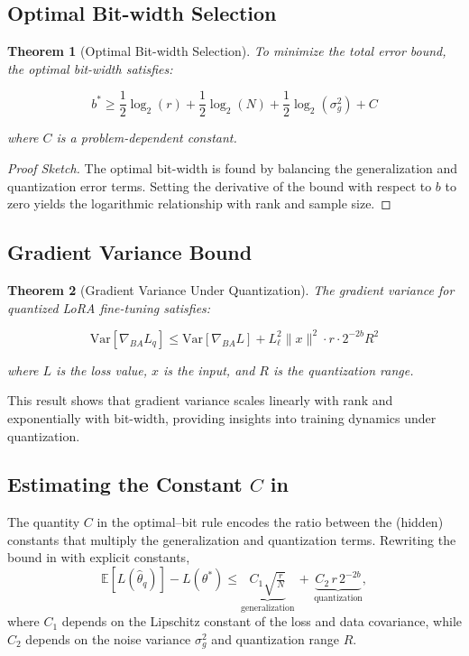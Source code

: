 \documentclass[10pt,twocolumn]{article}
\newcommand{\E}{\mathbb{E}}
\newcommand{\Var}{\text{Var}}
\newtheorem{theorem}{Theorem}[section]
\begin{document}
\subsection{Optimal Bit-width Selection}

\begin{theorem}[Optimal Bit-width Selection]
\label{thm:optimal_bits}
To minimize the total error bound, the optimal bit-width satisfies:

\begin{equation}
b^* \geq \frac{1}{2}\log_2(r) + \frac{1}{2}\log_2(N) + \frac{1}{2}\log_2(\sigma_g^2) + C
\end{equation}

where $C$ is a problem-dependent constant.
\end{theorem}

\begin{proof}[Proof Sketch]
The optimal bit-width is found by balancing the generalization and quantization error terms. Setting the derivative of the bound with respect to $b$ to zero yields the logarithmic relationship with rank and sample size.
\end{proof}

\subsection{Gradient Variance Bound}

\begin{theorem}[Gradient Variance Under Quantization]
\label{thm:gradient_variance}
The gradient variance for quantized LoRA fine-tuning satisfies:

\begin{equation}
\Var[\nabla_{BA} L_q] \leq \Var[\nabla_{BA} L] + L_{\ell}^2 \|x\|^2 \cdot r \cdot 2^{-2b} R^2
\end{equation}

where $L$ is the loss value, $x$ is the input, and $R$ is the quantization range.
\end{theorem}

This result shows that gradient variance scales linearly with rank and exponentially with bit-width, providing insights into training dynamics under quantization.

\subsection{Estimating the Constant $C$ in }

The quantity $C$ in the optimal--bit rule encodes the ratio between the (hidden) constants that multiply the generalization and quantization terms.  Rewriting the bound in  with explicit constants,
\begin{equation}
\label{eq:explicit_constants}
\E[L(\hat{\theta}_q)] - L(\theta^*) \leq \underbrace{C_1 \sqrt{\tfrac{r}{N}}}_{\text{generalization}} \, + \, \underbrace{C_2\, r\, 2^{-2b}}_{\text{quantization}},
\end{equation}
where $C_1$ depends on the Lipschitz constant of the loss and data covariance, while $C_2$ depends on the noise variance $\sigma_g^2$ and quantization range $R$.
\end{document}
